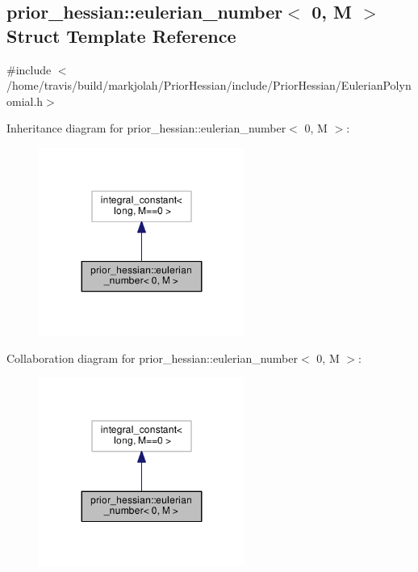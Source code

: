 \hypertarget{structprior__hessian_1_1eulerian__number_3_010_00_01M_01_4}{}\subsection{prior\+\_\+hessian\+:\+:eulerian\+\_\+number$<$ 0, M $>$ Struct Template Reference}
\label{structprior__hessian_1_1eulerian__number_3_010_00_01M_01_4}


{\ttfamily \#include $<$/home/travis/build/markjolah/\+Prior\+Hessian/include/\+Prior\+Hessian/\+Eulerian\+Polynomial.\+h$>$}



Inheritance diagram for prior\+\_\+hessian\+:\+:eulerian\+\_\+number$<$ 0, M $>$\+:\nopagebreak
\begin{figure}[H]
\begin{center}
\leavevmode
\includegraphics[width=191pt]{structprior__hessian_1_1eulerian__number_3_010_00_01M_01_4__inherit__graph}
\end{center}
\end{figure}


Collaboration diagram for prior\+\_\+hessian\+:\+:eulerian\+\_\+number$<$ 0, M $>$\+:\nopagebreak
\begin{figure}[H]
\begin{center}
\leavevmode
\includegraphics[width=191pt]{structprior__hessian_1_1eulerian__number_3_010_00_01M_01_4__coll__graph}
\end{center}
\end{figure}


